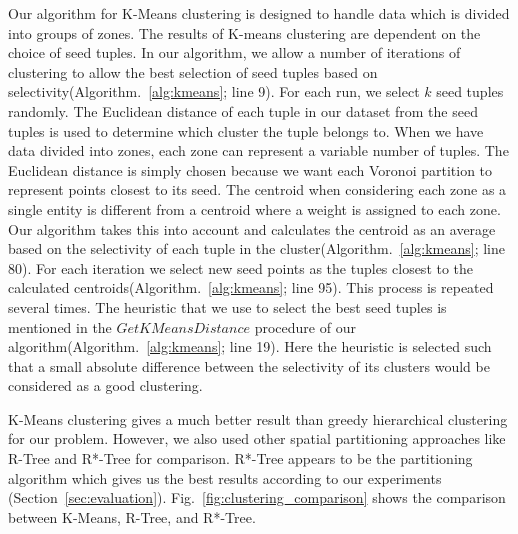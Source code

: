 Our algorithm for K-Means clustering is designed to handle data which is divided into groups of zones. The results of K-means clustering are dependent on the choice of seed tuples. In our algorithm, we allow a number of iterations of clustering to allow the best selection of seed tuples based on selectivity(Algorithm.~\ref{alg:kmeans}; line 9). For each run, we select $k$ seed tuples randomly. The Euclidean distance of each tuple in our dataset from the seed tuples is used to determine which cluster the tuple belongs to. When we have data divided into zones, each zone can represent a variable number of tuples. The Euclidean distance is simply chosen because we want each Voronoi partition to represent points closest to its seed. The centroid when considering each zone as a single entity is different from a centroid where a weight is assigned to each zone. Our algorithm takes this into account and calculates the centroid as an average based on the selectivity of each tuple in the cluster(Algorithm.~\ref{alg:kmeans}; line 80). For each iteration we select new seed points as the tuples closest to the calculated centroids(Algorithm.~\ref{alg:kmeans}; line 95). This process is repeated several times. The heuristic that we use to select the best seed tuples is mentioned in the $GetKMeansDistance$ procedure of our algorithm(Algorithm.~\ref{alg:kmeans}; line 19). Here the heuristic is selected such that a small absolute difference between the selectivity of its clusters would be considered as a good clustering.

K-Means clustering gives a much better result than greedy hierarchical clustering for our problem. However, we also used other spatial partitioning approaches like R-Tree and R*-Tree for comparison. R*-Tree appears to be the partitioning algorithm which gives us the best results according to our experiments (Section~\ref{sec:evaluation}). Fig.~\ref{fig:clustering_comparison} shows the comparison between K-Means, R-Tree, and R*-Tree.

